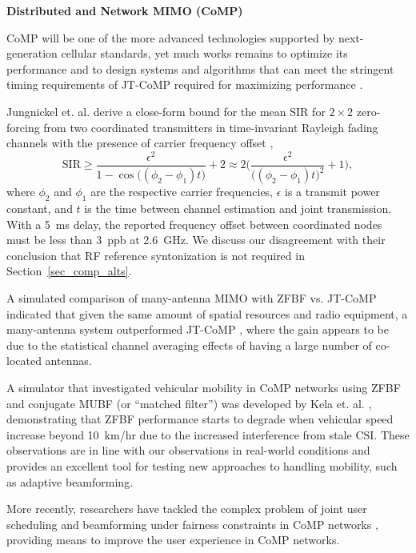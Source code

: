 \textbf{Distributed and Network \ac{MIMO} (CoMP)}

	\ac{CoMP} will be one of the more advanced technologies supported by next-generation cellular standards, yet much works remains to optimize its performance and to design systems and algorithms that can meet the stringent timing requirements of \ac{JT}-\ac{CoMP} required for maximizing performance \cite{ali2014evolution, cui2014evolution}.
	
	Jungnickel et. al. derive a close-form bound for the mean \ac{SIR} for $2\times 2$ zero-forcing from two coordinated transmitters in time-invariant Rayleigh fading channels with the presence of carrier frequency offset \cite{jungnickel2008synchronization},
\begin{equation}
\text{SIR} \geqslant \frac{\epsilon^2}{1-\cos\big((\phi_2 - \phi_1) t\big)}+2 \approx 2\bigg(\frac{\epsilon^2}{\big((\phi_2 - \phi_1) t\big)^2}+1\bigg),
\end{equation}
where $\phi_2$ and $\phi_1$ are the respective carrier frequencies, $\epsilon$ is a transmit power constant, and $t$ is the time between channel estimation and joint transmission.
	With a 5~ms delay, the reported frequency offset between coordinated nodes must be less than 3~ppb at 2.6~GHz.
	We discuss our disagreement with their conclusion that RF reference syntonization is not required in Section~\ref{sec_comp_alts}.
	
	A simulated comparison of many-antenna \ac{MIMO} with \ac{ZFBF} vs. \ac{JT}-\ac{CoMP} indicated that given the same amount of spatial resources and radio equipment, a many-antenna system outperformed \ac{JT}-\ac{CoMP} \cite{hosseini2014large}, where the gain appears to be due to the statistical channel averaging effects of having a large number of co-located antennas.
	
	A simulator that investigated vehicular mobility in \ac{CoMP} networks using \ac{ZFBF} and conjugate \ac{MUBF} (or ``matched filter'') was developed by Kela et. al. \cite{kela2015borderless}, demonstrating that \ac{ZFBF} performance starts to degrade when vehicular speed increase beyond 10~km/hr due to the increased interference from stale \ac{CSI}.
	These observations are in line with our observations in real-world conditions and provides an excellent tool for testing new approaches to handling mobility, such as adaptive beamforming.
	
	More recently, researchers have tackled the complex problem of joint user scheduling and beamforming under fairness constraints in \ac{CoMP} networks \cite{liu2018load}, providing means to improve the user experience in \ac{CoMP} networks.
	
